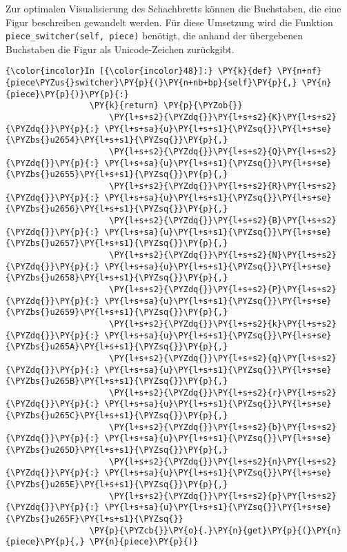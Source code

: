     Zur optimalen Visualisierung des Schachbretts können die Buchstaben, die
eine Figur beschreiben gewandelt werden. Für
diese Umsetzung wird die Funktion \texttt{piece\_switcher(self,\ piece)}
benötigt, die anhand der übergebenen Buchstaben die Figur als
Unicode-Zeichen zurückgibt.

    \begin{Verbatim}[commandchars=\\\{\}]
{\color{incolor}In [{\color{incolor}48}]:} \PY{k}{def} \PY{n+nf}{piece\PYZus{}switcher}\PY{p}{(}\PY{n+nb+bp}{self}\PY{p}{,} \PY{n}{piece}\PY{p}{)}\PY{p}{:}
                 \PY{k}{return} \PY{p}{\PYZob{}}
                     \PY{l+s+s2}{\PYZdq{}}\PY{l+s+s2}{K}\PY{l+s+s2}{\PYZdq{}}\PY{p}{:} \PY{l+s+sa}{u}\PY{l+s+s1}{\PYZsq{}}\PY{l+s+se}{\PYZbs{}u2654}\PY{l+s+s1}{\PYZsq{}}\PY{p}{,}
                     \PY{l+s+s2}{\PYZdq{}}\PY{l+s+s2}{Q}\PY{l+s+s2}{\PYZdq{}}\PY{p}{:} \PY{l+s+sa}{u}\PY{l+s+s1}{\PYZsq{}}\PY{l+s+se}{\PYZbs{}u2655}\PY{l+s+s1}{\PYZsq{}}\PY{p}{,}
                     \PY{l+s+s2}{\PYZdq{}}\PY{l+s+s2}{R}\PY{l+s+s2}{\PYZdq{}}\PY{p}{:} \PY{l+s+sa}{u}\PY{l+s+s1}{\PYZsq{}}\PY{l+s+se}{\PYZbs{}u2656}\PY{l+s+s1}{\PYZsq{}}\PY{p}{,}
                     \PY{l+s+s2}{\PYZdq{}}\PY{l+s+s2}{B}\PY{l+s+s2}{\PYZdq{}}\PY{p}{:} \PY{l+s+sa}{u}\PY{l+s+s1}{\PYZsq{}}\PY{l+s+se}{\PYZbs{}u2657}\PY{l+s+s1}{\PYZsq{}}\PY{p}{,}
                     \PY{l+s+s2}{\PYZdq{}}\PY{l+s+s2}{N}\PY{l+s+s2}{\PYZdq{}}\PY{p}{:} \PY{l+s+sa}{u}\PY{l+s+s1}{\PYZsq{}}\PY{l+s+se}{\PYZbs{}u2658}\PY{l+s+s1}{\PYZsq{}}\PY{p}{,}
                     \PY{l+s+s2}{\PYZdq{}}\PY{l+s+s2}{P}\PY{l+s+s2}{\PYZdq{}}\PY{p}{:} \PY{l+s+sa}{u}\PY{l+s+s1}{\PYZsq{}}\PY{l+s+se}{\PYZbs{}u2659}\PY{l+s+s1}{\PYZsq{}}\PY{p}{,}
                     \PY{l+s+s2}{\PYZdq{}}\PY{l+s+s2}{k}\PY{l+s+s2}{\PYZdq{}}\PY{p}{:} \PY{l+s+sa}{u}\PY{l+s+s1}{\PYZsq{}}\PY{l+s+se}{\PYZbs{}u265A}\PY{l+s+s1}{\PYZsq{}}\PY{p}{,}
                     \PY{l+s+s2}{\PYZdq{}}\PY{l+s+s2}{q}\PY{l+s+s2}{\PYZdq{}}\PY{p}{:} \PY{l+s+sa}{u}\PY{l+s+s1}{\PYZsq{}}\PY{l+s+se}{\PYZbs{}u265B}\PY{l+s+s1}{\PYZsq{}}\PY{p}{,}
                     \PY{l+s+s2}{\PYZdq{}}\PY{l+s+s2}{r}\PY{l+s+s2}{\PYZdq{}}\PY{p}{:} \PY{l+s+sa}{u}\PY{l+s+s1}{\PYZsq{}}\PY{l+s+se}{\PYZbs{}u265C}\PY{l+s+s1}{\PYZsq{}}\PY{p}{,}
                     \PY{l+s+s2}{\PYZdq{}}\PY{l+s+s2}{b}\PY{l+s+s2}{\PYZdq{}}\PY{p}{:} \PY{l+s+sa}{u}\PY{l+s+s1}{\PYZsq{}}\PY{l+s+se}{\PYZbs{}u265D}\PY{l+s+s1}{\PYZsq{}}\PY{p}{,}
                     \PY{l+s+s2}{\PYZdq{}}\PY{l+s+s2}{n}\PY{l+s+s2}{\PYZdq{}}\PY{p}{:} \PY{l+s+sa}{u}\PY{l+s+s1}{\PYZsq{}}\PY{l+s+se}{\PYZbs{}u265E}\PY{l+s+s1}{\PYZsq{}}\PY{p}{,}
                     \PY{l+s+s2}{\PYZdq{}}\PY{l+s+s2}{p}\PY{l+s+s2}{\PYZdq{}}\PY{p}{:} \PY{l+s+sa}{u}\PY{l+s+s1}{\PYZsq{}}\PY{l+s+se}{\PYZbs{}u265F}\PY{l+s+s1}{\PYZsq{}}
                 \PY{p}{\PYZcb{}}\PY{o}{.}\PY{n}{get}\PY{p}{(}\PY{n}{piece}\PY{p}{,} \PY{n}{piece}\PY{p}{)}
\end{Verbatim}

